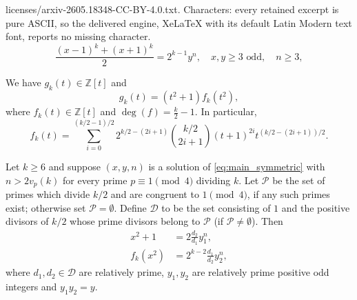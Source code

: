 \documentclass[10pt,a4paper]{amsart}
\newcommand{\ZZ}{\mathbb{Z}}
\newcommand{\cD}{\mathcal{D}}
\newcommand{\cP}{\mathcal{P}}
\begin{document}
licenses/arxiv-2605.18348-CC-BY-4.0.txt. Characters: every retained excerpt is pure ASCII, so the delivered engine, XeLaTeX with its default Latin Modern text font, reports no missing character.
\begin{equation}\label{eq:main_symmetric}
   \frac{(x-1)^k + (x+1)^k}{2} = 2^{k-1}y^n, \quad 
   x,y\ge 3\text{ odd},\quad n\ge 3,
\end{equation}

\begin{lemma}\label{lem:quadratic_factor}
We have $g_k(t)\in\ZZ[t]$ and 
\begin{equation*}
    g_k(t) = (t^2 + 1)f_k(t^2),
\end{equation*}
where $f_k(t)\in\ZZ[t]$ and $\deg(f)=\frac{k}{2} - 1$. In particular,
\begin{equation}\label{eq:fk}
    f_k(t) = \sum_{i=0}^{(k/2-1)/2}2^{k/2-(2i+1)}
    \binom{k/2}{2i+1}(t+1)^{2i}t^{(k/2-(2i+1))/2}.
\end{equation}
\end{lemma}

\begin{lemma}\label{lem:equations_system}
Let $k\ge 6$ and suppose $(x,y,n)$ is a solution of \eqref{eq:main_symmetric} with $n>2v_p(k)$ for every prime $p\equiv 1\pmod 4$ dividing $k$. Let $\cP$ be the set of primes which divide $k/2$ and are congruent to $1\pmod 4$, if any such primes exist; otherwise set $\cP=\emptyset$. Define $\cD$ to be the set consisting of $1$ and the positive divisors of $k/2$ whose prime divisors belong to $\cP$ (if $\cP\ne\emptyset$). Then
\begin{align}
    x^2 + 1 & = 2\frac{d_2}{d_1}y_1^n,     \label{eq:express_x^2+1}
    \\
    f_k(x^2) & = 2^{k-2}\frac{d_1}{d_2}y_2^n,   \label{eq:express_f_k(x^2)}
\end{align}
where $d_1,d_2\in\cD$ are relatively prime, $y_1,y_2$ are relatively prime positive odd integers and $y_1y_2=y$.
\end{lemma}
\end{document}
